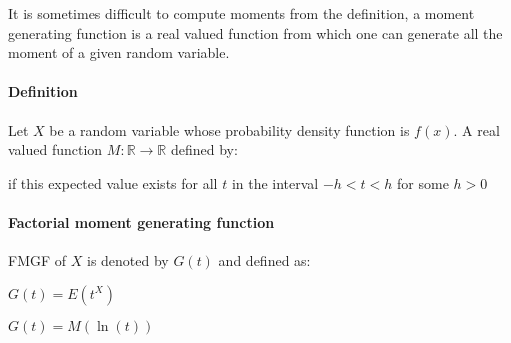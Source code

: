 It is sometimes difficult to compute moments from the definition, a moment
generating function is a real valued function from which one can generate 
all the moment of a given random variable.
\paragraph{Definition}
Let $X$ be a random variable whose probability density function is $f(x)$.
A real valued function $M:\mathbb{R}\rightarrow\mathbb{R}$ defined by:
\begin{center}
\end{center}
if this expected value exists for all $t$ in the interval $-h<t<h$ for some
$h>0$
\paragraph{Factorial moment generating function}
FMGF of $X$ is denoted by $G(t)$ and defined as:
\begin{center}
	$G(t)=E(t^{X})$
\end{center}
$G(t)= M(\ln(t))$
